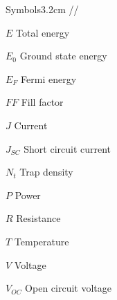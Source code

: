 \begin{mclistof}{Symbols}{3.2cm}
//

\item[$E$] Total energy
\item[$E_0$] Ground state energy
\item[$E_F$] Fermi energy
\item[$FF$] Fill factor
\item[$J$] Current
\item[$J_{SC}$] Short circuit current
\item[$N_t$] Trap density
\item[$P$] Power
\item[$R$] Resistance
\item[$T$] Temperature
\item[$V$] Voltage
\item[$V_{OC}$] Open circuit voltage


\end{mclistof} 